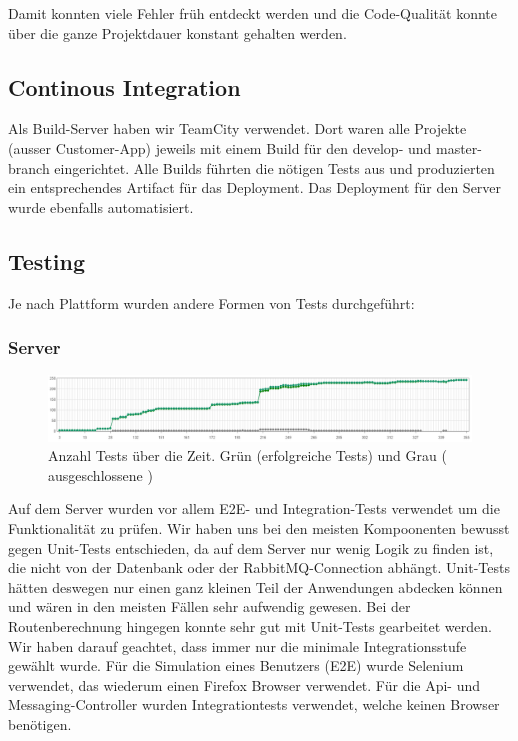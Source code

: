Damit konnten viele Fehler früh entdeckt werden und die Code-Qualität konnte über die ganze Projektdauer konstant gehalten werden.

\subsection{Continous Integration}

Als Build-Server haben wir TeamCity verwendet. Dort waren alle Projekte (ausser Customer-App) jeweils mit einem Build für den develop- und master-branch eingerichtet. Alle Builds führten die nötigen Tests aus und produzierten ein entsprechendes Artifact für das Deployment. Das Deployment für den Server wurde ebenfalls automatisiert.

\subsection{Testing}

Je nach Plattform wurden andere Formen von Tests durchgeführt:

\subsubsection{Server}
\begin{figure}[h]
	\centering
	\includegraphics[width=1\textwidth] {images/test-count-chart.png}
	\caption{Anzahl Tests über die Zeit. Grün (erfolgreiche Tests) und Grau ( ausgeschlossene )}
\end{figure}

Auf dem Server wurden vor allem E2E- und Integration-Tests verwendet um die Funktionalität zu prüfen. Wir haben uns bei den meisten Kompoonenten bewusst gegen Unit-Tests entschieden, da auf dem Server nur wenig Logik zu finden ist, die nicht von der Datenbank oder der RabbitMQ-Connection abhängt. Unit-Tests hätten deswegen nur einen ganz kleinen Teil der Anwendungen abdecken können und wären in den meisten Fällen sehr aufwendig gewesen. Bei der Routenberechnung hingegen konnte sehr gut mit Unit-Tests gearbeitet werden.\\

Wir haben darauf geachtet, dass immer nur die minimale Integrationsstufe gewählt wurde. Für die Simulation eines Benutzers (E2E) wurde Selenium verwendet, das wiederum einen Firefox Browser verwendet. Für die Api- und Messaging-Controller wurden Integrationtests verwendet, welche keinen Browser benötigen.\\

